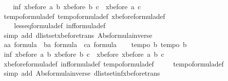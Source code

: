 \begin{isabellebody}
\ \ \isamarkupfalse%
\ {\isachardoublequoteopen}inf\ {\isacharparenleft}xbefore\ a\ b{\isacharparenright}\ {\isacharparenleft}xbefore\ b\ c{\isacharparenright}\ {\isasymle}\ xbefore\ a\ c{\isachardoublequoteclose}\isanewline
\ \ \isamarkupfalse%
\ tempo{}{\isacharunderscore}formula{\isacharunderscore}def\ tempo{}{\isacharunderscore}formula{\isacharunderscore}def\ xbefore{\isacharunderscore}formula{\isacharunderscore}def\ \isanewline
\ \ \ \ less{\isacharunderscore}eq{\isacharunderscore}formula{\isacharunderscore}def\ inf{\isacharunderscore}formula{\isacharunderscore}def\isanewline
\ \ \isamarkupfalse%
\ {\isacharparenleft}simp\ add{\isacharcolon}\ dlistset{\isacharunderscore}xbefore{\isacharunderscore}trans\ Abs{\isacharunderscore}formula{\isacharunderscore}inverse{\isacharparenright}\isanewline
\ \ \isamarkupfalse%
\isanewline
\ \ \isamarkupfalse%
\ a{\isacharcolon}{\isacharcolon}{\isachardoublequoteopen}{\isacharprime}a\ formula{\isachardoublequoteclose}\ \ b{\isacharcolon}{\isacharcolon}{\isachardoublequoteopen}{\isacharprime}a\ formula{\isachardoublequoteclose}\ \ c{\isacharcolon}{\isacharcolon}{\isachardoublequoteopen}{\isacharprime}a\ formula{\isachardoublequoteclose}\isanewline
\ \ \isamarkupfalse%
\ {\isachardoublequoteopen}tempo{}\ b{\isachardoublequoteclose}\ {\isachardoublequoteopen}tempo{}\ b{\isachardoublequoteclose}\isanewline
\ \ \isamarkupfalse%
\ {\isachardoublequoteopen}inf\ {\isacharparenleft}xbefore\ a\ b{\isacharparenright}\ {\isacharparenleft}xbefore\ b\ c{\isacharparenright}\ {\isacharequal}\ xbefore\ {\isacharparenleft}xbefore\ a\ b{\isacharparenright}\ c{\isachardoublequoteclose}\isanewline
\ \ \isamarkupfalse%
\ xbefore{\isacharunderscore}formula{\isacharunderscore}def\ inf{\isacharunderscore}formula{\isacharunderscore}def\ tempo{}{\isacharunderscore}formula{\isacharunderscore}def\ \isanewline
\ \ \ \ tempo{}{\isacharunderscore}formula{\isacharunderscore}def\isanewline
\ \ \isamarkupfalse%
\ {\isacharparenleft}simp\ add{\isacharcolon}\ Abs{\isacharunderscore}formula{\isacharunderscore}inverse\ dlistset{\isacharunderscore}inf{\isacharunderscore}xbefore{\isacharunderscore}trans{\isacharparenright}\isanewline
{}\isamarkupfalse%
%
\endisatagproof
{\isafoldproof}%
%
\isadelimproof
%
\endisadelimproof
\isanewline
{}\isamarkupfalse%
%
\end{isabellebody}
